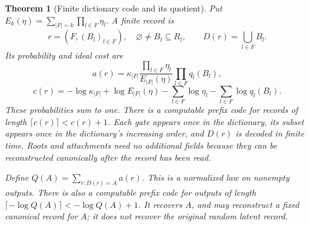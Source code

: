 \documentclass{article}
\newtheorem{theorem}{Theorem}
\begin{document}
\begin{theorem}[Finite dictionary code and its quotient]
Put $E_k(\eta)=\sum_{|F|=k}\prod_{l\in F}\eta_l$. A finite record is
\[
 r=(F,(B_l)_{l\in F}),\quad \varnothing\ne B_l\subseteq R_l,
 \qquad D(r)=\bigcup_{l\in F}B_l.
\]
Its probability and ideal cost are
\[
 a(r)=\kappa_{|F|}\frac{\prod_{l\in F}\eta_l}{E_{|F|}(\eta)}
                  \prod_{l\in F}q_l(B_l),
\]
\[
 c(r)=-\log\kappa_{|F|}+\log E_{|F|}(\eta)
       -\sum_{l\in F}\log\eta_l-\sum_{l\in F}\log q_l(B_l).
\]
These probabilities sum to one. There is a computable prefix code for records of length $\lceil c(r)\rceil<c(r)+1$. Each gate appears once in the dictionary, its subset appears once in the dictionary's increasing order, and $D(r)$ is decoded in finite time. Roots and attachments need no additional fields because they can be reconstructed canonically after the record has been read.

Define $Q(A)=\sum_{r:D(r)=A}a(r)$. This is a normalized law on nonempty outputs. There is also a computable prefix code for outputs of length $\lceil-\log Q(A)\rceil<-\log Q(A)+1$. It recovers $A$, and may reconstruct a fixed canonical record for $A$; it does not recover the original random latent record.
\end{theorem}
\end{document}
